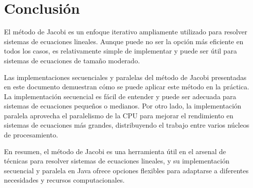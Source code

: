 \documentclass[]{article}
\begin{document}
    \section{Conclusión}

El método de Jacobi es un enfoque iterativo ampliamente utilizado para resolver sistemas de ecuaciones lineales. Aunque puede no ser la opción más eficiente en todos los casos, es relativamente simple de implementar y puede ser útil para sistemas de ecuaciones de tamaño moderado.

Las implementaciones secuenciales y paralelas del método de Jacobi presentadas en este documento demuestran cómo se puede aplicar este método en la práctica. La implementación secuencial es fácil de entender y puede ser adecuada para sistemas de ecuaciones pequeños o medianos. Por otro lado, la implementación paralela aprovecha el paralelismo de la CPU para mejorar el rendimiento en sistemas de ecuaciones más grandes, distribuyendo el trabajo entre varios núcleos de procesamiento.

En resumen, el método de Jacobi es una herramienta útil en el arsenal de técnicas para resolver sistemas de ecuaciones lineales, y su implementación secuencial y paralela en Java ofrece opciones flexibles para adaptarse a diferentes necesidades y recursos computacionales.

    
\end{document}
